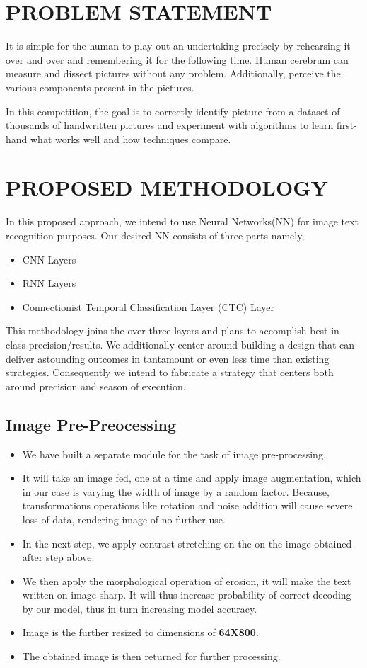 \documentclass[12pt, conference]{IEEEtran}
\begin{document}
\section{\textbf{PROBLEM STATEMENT}}
It is simple for the human to play out an undertaking precisely by rehearsing it over and over and remembering it for the following time. Human cerebrum can measure and dissect pictures without any problem. Additionally, perceive the
various components present in the pictures.

In this competition, the goal is to correctly identify picture from a dataset of thousands of handwritten pictures and experiment with algorithms to learn first-hand what works well and how techniques compare.

\section{\textbf{PROPOSED METHODOLOGY}}
In this proposed approach, we intend to use Neural Networks(NN) for image text recognition purposes. Our desired NN consists of three parts namely,
\begin{itemize}
    \item CNN Layers
    \item RNN Layers
    \item Connectionist Temporal Classification Layer (CTC) Layer
\end{itemize}
This methodology joins the over three layers and plans to accomplish best in class precision/results. We additionally center around building a design that can deliver astounding outcomes in tantamount or even less time than existing strategies. Consequently we intend to fabricate a strategy that centers both around precision and season of execution.

\subsection{\textbf{Image Pre-Preocessing}}
\begin{itemize}
    \item We have built a separate module for the task of image pre-processing.
    \item It will take an image fed, one at a time and apply image augmentation, which in our case is varying the width of image by a random factor. Because, transformations operations like rotation and noise addition will cause severe loss of data, rendering image of no further use.
    \item In the next step, we apply contrast stretching on the on the image obtained after step above.
    \item We then apply the morphological operation of erosion, it will make the text written on image sharp. It will thus increase probability of correct decoding by our model, thus in turn increasing model accuracy.
    \item Image is the further resized to dimensions of \textbf{64X800}.
    \item The obtained image is then returned for further processing.
\end{itemize}
\end{document}
